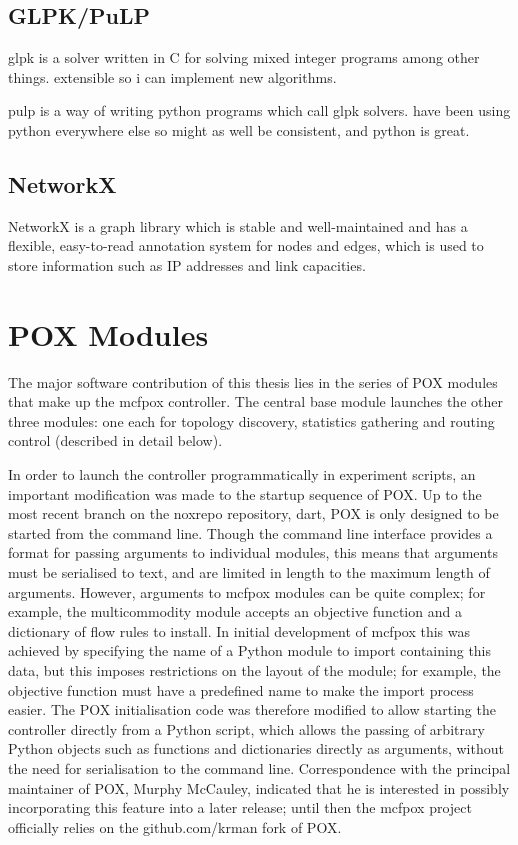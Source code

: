 \subsection{GLPK/PuLP}
glpk is a solver written in C for solving mixed integer programs among other things. extensible so i can implement new algorithms.

pulp is a way of writing python programs which call glpk solvers. have been using python everywhere else so might as well be consistent, and python is great.

\subsection{NetworkX}
NetworkX is a graph library which is stable and well-maintained and has a flexible, easy-to-read annotation system for nodes and edges, which is used to store information such as IP addresses and link capacities.

\section{POX Modules}
The major software contribution of this thesis lies in the series of POX modules that make up the mcfpox controller. The central base module launches the other three modules: one each for topology discovery, statistics gathering and routing control (described in detail below).

In order to launch the controller programmatically in experiment scripts, an important modification was made to the startup sequence of POX. Up to the most recent branch on the noxrepo repository, dart, POX is only designed to be started from the command line. Though the command line interface provides a format for passing arguments to individual modules, this means that arguments must be serialised to text, and are limited in length to the maximum length of arguments. However, arguments to mcfpox modules can be quite complex; for example, the multicommodity module accepts an objective function and a dictionary of flow rules to install. In initial development of mcfpox this was achieved by specifying the name of a Python module to import containing this data, but this imposes restrictions on the layout of the module; for example, the objective function must have a predefined name to make the import process easier. The POX initialisation code was therefore modified to allow starting the controller directly from a Python script, which allows the passing of arbitrary Python objects such as functions and dictionaries directly as arguments, without the need for serialisation to the command line. Correspondence with the principal maintainer of POX, Murphy McCauley, indicated that he is interested in possibly incorporating this feature into a later release; until then the mcfpox project officially relies on the github.com/krman fork of POX. 

